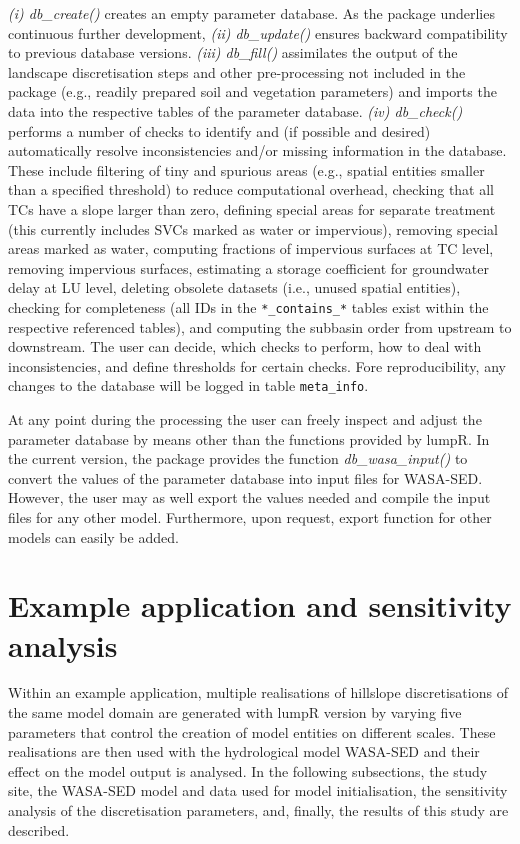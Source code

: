 \emph{(i) db\_create()} creates an empty parameter database.
As the package underlies continuous further development, \emph{(ii) db\_update()} ensures backward compatibility to previous database versions.
\emph{(iii) db\_fill()} assimilates the output of the landscape discretisation steps and other pre-processing not included in the package (e.g., readily prepared soil and vegetation parameters) and imports the data into the respective tables of the parameter database.
\emph{(iv) db\_check()} performs a number of checks to identify and (if possible and desired) automatically resolve inconsistencies and/or missing information in the database.
These include filtering of tiny and spurious areas (e.g., spatial entities smaller than a specified threshold) to reduce computational overhead, checking that all TCs have a slope larger than zero, defining special areas for separate treatment (this currently includes SVCs marked as water or impervious), removing special areas marked as water, computing fractions of impervious surfaces at TC level, removing impervious surfaces, estimating a storage coefficient for groundwater delay at LU level, deleting obsolete datasets (i.e., unused spatial entities), checking for completeness (all IDs in the \verb|*_contains_*| tables exist within the respective referenced tables), and computing the subbasin order from upstream to downstream.
The user can decide, which checks to perform, how to deal with inconsistencies, and define thresholds for certain checks.
Fore reproducibility, any changes to the database will be logged in table \verb|meta_info|.

At any point during the processing the user can freely inspect and adjust the parameter database by means other than the functions provided by lumpR.
In the current version, the package provides the function \emph{db\_wasa\_input()} to convert the values of the parameter database into input files for WASA-SED.
However, the user may as well export the values needed and compile the input files for any other model.
Furthermore, upon request, export function for other models can easily be added.




\section{Example application and sensitivity analysis}
\label{sec:case_study}
Within an example application, multiple realisations of hillslope discretisations of the same model domain are generated with lumpR version \DIFdelbegin {}\DIFdelend \DIFaddbegin {}\DIFaddend by varying five parameters that control the creation of model entities on different scales.
These realisations are then used with the hydrological model WASA-SED and their effect on the model output is analysed.
In the following subsections, the study site, the WASA-SED model \DIFdelbegin \DIFdel{, }\DIFdelend and data used for model initialisation, the sensitivity analysis of the discretisation parameters, and, finally, the results of this study are described.


